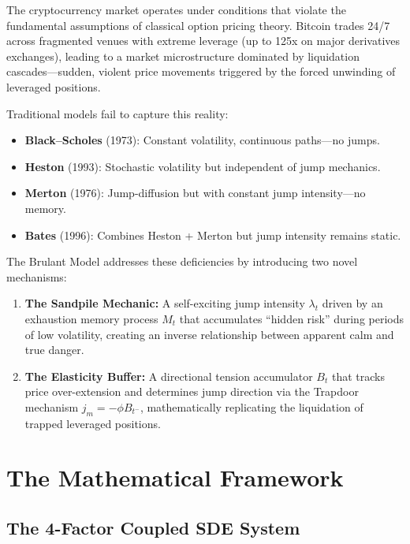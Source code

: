 \documentclass[11pt,a4paper]{article}
\begin{document}
The cryptocurrency market operates under conditions that violate the
fundamental assumptions of classical option pricing theory. Bitcoin
trades 24/7 across fragmented venues with extreme leverage (up to 125x
on major derivatives exchanges), leading to a market microstructure
dominated by liquidation cascades---sudden, violent price movements
triggered by the forced unwinding of leveraged positions.

Traditional models fail to capture this reality:
\begin{itemize}[nosep]
  \item \textbf{Black--Scholes} (1973): Constant volatility, continuous paths---no jumps.
  \item \textbf{Heston} (1993): Stochastic volatility but independent of jump mechanics.
  \item \textbf{Merton} (1976): Jump-diffusion but with constant jump intensity---no memory.
  \item \textbf{Bates} (1996): Combines Heston + Merton but jump intensity remains static.
\end{itemize}

The Brulant Model addresses these deficiencies by introducing two novel
mechanisms:
\begin{enumerate}[nosep]
  \item \textbf{The Sandpile Mechanic:} A self-exciting jump intensity
    $\lambda_t$ driven by an exhaustion memory process $M_t$ that
    accumulates ``hidden risk'' during periods of low volatility, creating
    an inverse relationship between apparent calm and true danger.
  \item \textbf{The Elasticity Buffer:} A directional tension accumulator
    $B_t$ that tracks price over-extension and determines jump direction
    via the Trapdoor mechanism $j_m = -\phi B_{t^-}$, mathematically
    replicating the liquidation of trapped leveraged positions.
\end{enumerate}

\section{The Mathematical Framework}
\label{sec:framework}

\subsection{The 4-Factor Coupled SDE System}
\end{document}
